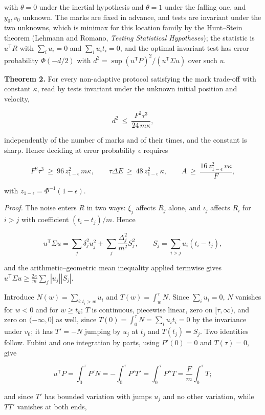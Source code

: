 \documentclass[11pt,a4paper]{article}
\begin{document}
with \(\theta=0\) under the inertial hypothesis and \(\theta=1\) under
the falling one, and \(y_0,v_0\) unknown. The marks are fixed in
advance, and tests are invariant under the two unknowns, which is
minimax for this location family by the Hunt--Stein theorem (Lehmann and
Romano, \emph{Testing Statistical Hypotheses}); the statistic is
\(u^{\mathsf T}R\) with \(\sum_iu_i=0\) and \(\sum_iu_it_i=0\), and the
optimal invariant test has error probability \(\Phi(-d/2)\) with
\(d^2=\sup(u^{\mathsf T}P)^2/(u^{\mathsf T}\Sigma u)\) over such \(u\).

\textbf{Theorem 2.} For every non-adaptive protocol satisfying the mark
trade-off with constant \(\kappa\), read by tests invariant under the
unknown initial position and velocity,

\[d^2\ \le\ \frac{F^2\tau^3}{24\,m\kappa},\]

independently of the number of marks and of their times, and the
constant is sharp. Hence deciding at error probability \(\epsilon\)
requires

\[F^2\tau^3\ \ge\ 96\,z_{1-\epsilon}^2\,m\kappa,\qquad
\tau\Delta E\ \ge\ 48\,z_{1-\epsilon}^2\,\kappa,\qquad
A\ \ge\ \frac{16\,z_{1-\epsilon}^2\,v\kappa}{F},\]

with \(z_{1-\epsilon}=\Phi^{-1}(1-\epsilon)\).

\emph{Proof.} The noise enters \(R\) in two ways: \(\xi_j\) affects
\(R_j\) alone, and \(\iota_j\) affects \(R_i\) for \(i>j\) with
coefficient \((t_i-t_j)/m\). Hence

\[u^{\mathsf T}\Sigma u=\sum_j\delta_j^2u_j^2
+\sum_j\frac{\Delta_j^2}{m^2}S_j^2,\qquad S_j=\sum_{i>j}u_i(t_i-t_j),\]

and the arithmetic--geometric mean inequality applied termwise gives
\(u^{\mathsf T}\Sigma u\ge\frac{2\kappa}{m}\sum_j|u_j||S_j|\).

Introduce \(N(w)=\sum_{i:t_i>w}u_i\) and \(T(w)=\int_w^\tau N\). Since
\(\sum_iu_i=0\), \(N\) vanishes for \(w<0\) and for \(w\ge t_k\); \(T\)
is continuous, piecewise linear, zero on \([\tau,\infty)\), and zero on
\((-\infty,0]\) as well, since \(T(0)=\int_0^\tau N=\sum_iu_it_i=0\) by
the invariance under \(v_0\); it has \(T'=-N\) jumping by \(u_j\) at
\(t_j\) and \(T(t_j)=S_j\). Two identities follow. Fubini and one
integration by parts, using \(P'(0)=0\) and \(T(\tau)=0\), give

\[u^{\mathsf T}P=\int_0^\tau P'N=-\int_0^\tau P'T'=\int_0^\tau P''T
=\frac Fm\int_0^\tau T;\]

and since \(T'\) has bounded variation with jumps \(u_j\) and no other
variation, while \(TT'\) vanishes at both ends,
\end{document}
